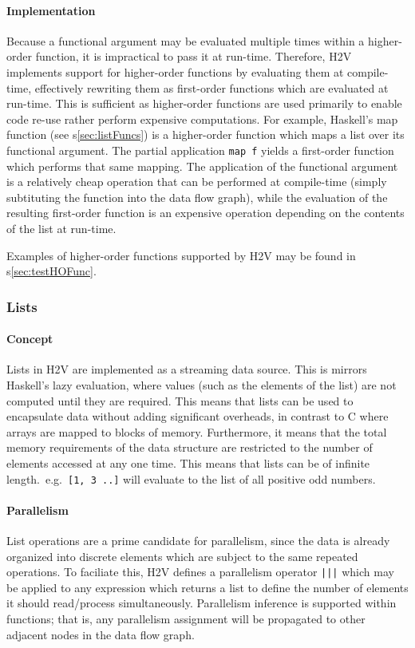 \documentclass[english,onecolumn]{scrartcl}
\begin{document}
\paragraph{Implementation}
Because a functional argument may be evaluated multiple times within a higher-order function, it is impractical to pass it at
run-time. Therefore, H2V implements support for higher-order functions by evaluating them at compile-time, effectively rewriting
them as first-order functions which are evaluated at run-time. This is sufficient as higher-order functions are used primarily to
enable code re-use rather perform expensive computations. For example, Haskell's map function (see s\ref{sec:listFuncs}) is a
higher-order function which maps a list over its functional argument. The partial application \texttt{map f} yields a first-order
function which performs that same mapping. The application of the functional argument is a relatively cheap operation that can be
performed at compile-time (simply subtituting the function into the data flow graph), while the evaluation of the resulting
first-order function is an expensive operation depending on the contents of the list at run-time.

Examples of higher-order functions supported by H2V may be found in s\ref{sec:testHOFunc}.

\subsubsection{Lists}
\paragraph{Concept}
Lists in H2V are implemented as a streaming data source. This is mirrors Haskell's lazy evaluation, where values (such as the
elements of the list) are not computed until they are required. This means that lists can be used to encapsulate data without
adding significant overheads, in contrast to C where arrays are mapped to blocks of memory. Furthermore, it means that the total
memory requirements of the data structure are restricted to the number of elements accessed at any one time. This means that lists
can be of infinite length.\ e.g.\ \texttt{[1, 3 ..]} will evaluate to the list of all positive odd numbers.

\paragraph{Parallelism}
\label{sec:listPar}
List operations are a prime candidate for parallelism, since the data is already organized into discrete elements which are
subject to the same repeated operations. To faciliate this, H2V defines a parallelism operator \texttt{|||} which may be applied
to any expression which returns a list to define the number of elements it should read/process simultaneously. Parallelism
inference is supported within functions; that is, any parallelism assignment will be propagated to other adjacent nodes in the
data flow graph.
\end{document}
